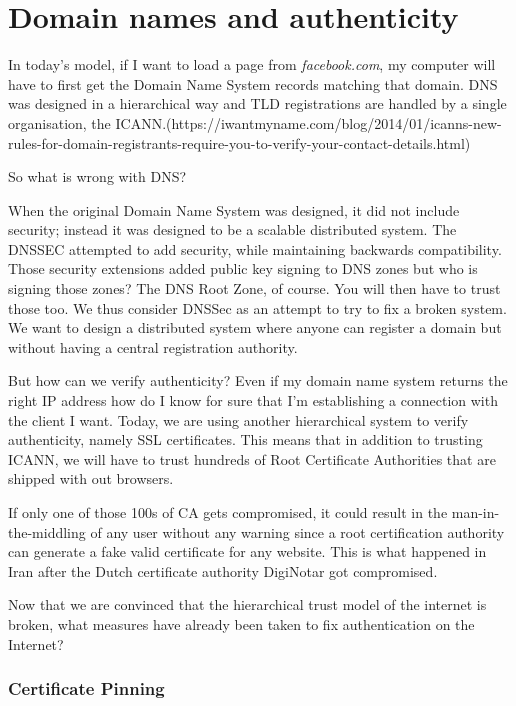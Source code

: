 \documentclass{vldb}
\begin{document}
\section{Domain names and authenticity}

In today's model, if I want to load a page from \emph{facebook.com}, my computer will have to first get the Domain Name System records matching that domain. DNS was designed in a hierarchical way and TLD registrations are handled by a single organisation, the ICANN.(https://iwantmyname.com/blog/2014/01/icanns-new-rules-for-domain-registrants-require-you-to-verify-your-contact-details.html)

So what is wrong with DNS?

When the original Domain Name System was designed, it did not include security; instead it was designed to be a scalable distributed system. The DNSSEC attempted to add security, while maintaining backwards compatibility. Those security extensions added public key signing to DNS zones but who is signing those zones? The DNS Root Zone, of course. You will then have to trust those too. We thus consider DNSSec as an attempt to try to fix a broken system. We want to design a distributed system where anyone can register a domain but without having a central registration authority.

But how can we verify authenticity? 
Even if my domain name system returns the right IP address how do I know for sure that I'm establishing a connection with the client I want. Today, we are using another hierarchical system to verify authenticity, namely SSL certificates. This means that in addition to trusting ICANN, we will have to trust hundreds of Root Certificate Authorities that are shipped with out browsers.\cite{mozillaSSL}

If only one of those 100s of CA gets compromised, it could result in the man-in-the-middling of any user without any warning since a root certification authority can generate a fake valid certificate for any website. This is what happened in Iran after the Dutch certificate authority DigiNotar got compromised\cite{diginotarHack}.

Now that we are convinced that the hierarchical trust model of the internet is broken, what measures have already been taken to fix authentication on the Internet?

\subsubsection{Certificate Pinning}
\end{document}
